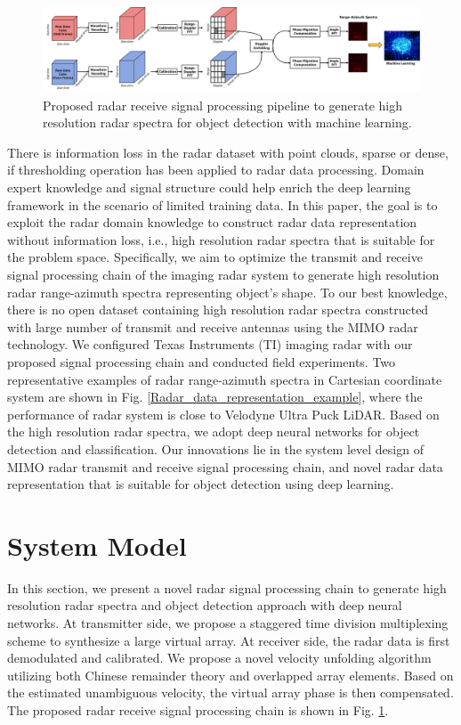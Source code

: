\documentclass[conference]{IEEEtran}
\begin{document}
\begin{figure}%
\centering
\includegraphics[width=7.0 in]{pic/signal_pip.pdf}
\vspace{-2mm}
\caption{\label{fig_signal_processing_chain} Proposed radar receive signal processing pipeline to generate high resolution radar spectra for object detection with machine learning.}
\vspace{-5mm}
\end{figure}

There is information loss in the radar dataset with point clouds, sparse or dense, if thresholding operation has been applied to radar data processing. Domain expert knowledge and signal structure could help enrich the deep learning framework in the scenario of limited training data. In this paper, the goal is to exploit the radar domain knowledge to construct radar data representation without information loss, i.e., high resolution radar spectra that is suitable for the problem space.  Specifically, we aim to optimize the transmit and receive signal processing chain of the imaging radar system to generate high resolution radar range-azimuth spectra representing object's shape. To our best knowledge, there is no open dataset containing high resolution radar spectra  constructed with large number of transmit and receive antennas using the MIMO radar technology.  We configured Texas Instruments (TI) imaging radar \cite{TI_Cascade} with our proposed signal processing chain and conducted field experiments. Two representative examples of radar range-azimuth spectra in Cartesian coordinate system  are shown  in Fig. \ref{Radar_data_representation_example}, where the performance of radar system is close to Velodyne Ultra Puck LiDAR. Based on the high resolution radar spectra, we adopt deep neural networks for object detection and classification.  Our innovations lie in the system level design of MIMO radar transmit and receive signal processing chain, and novel radar data representation that is suitable for object detection using deep learning.



\section{System Model }
In this section, we present a novel radar signal processing chain to generate high resolution radar spectra and object detection approach with deep neural networks.  At transmitter side, we propose a staggered time division multiplexing scheme to synthesize a large virtual array. At receiver side, the radar data is first demodulated and calibrated. We propose a novel velocity unfolding algorithm utilizing both Chinese remainder theory and overlapped array elements. Based on the  estimated unambiguous velocity, the virtual array phase is then compensated.  The proposed radar receive signal processing chain is shown in Fig. \ref{fig_signal_processing_chain}.
\end{document}
